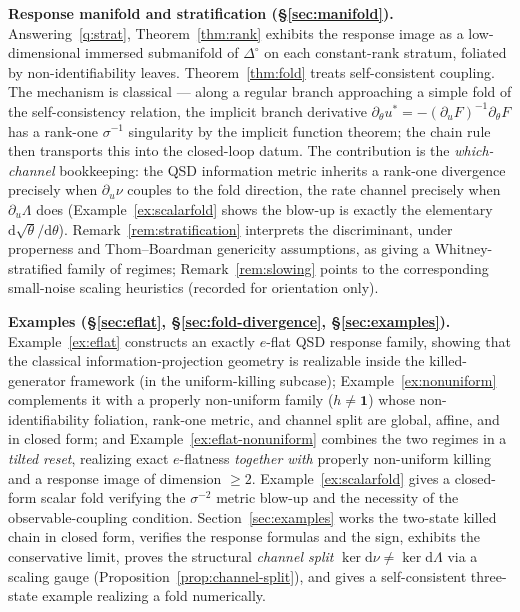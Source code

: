 \documentclass[11pt,reqno]{amsart}
\theoremstyle{plain}
\theoremstyle{definition}
\theoremstyle{remark}
\newcommand{\Simp}{\Delta^{\!\circ}}
\newcommand{\one}{\mathbf{1}}
\newcommand{\dd}{\mathrm{d}}
\begin{document}
\smallskip
\noindent\textbf{Response manifold and stratification (\S\ref{sec:manifold}).}
Answering~\ref{q:strat}, Theorem~\ref{thm:rank} exhibits the response image as a
low-dimensional immersed submanifold of $\Simp$ on each constant-rank stratum,
foliated by non-identifiability leaves. Theorem~\ref{thm:fold} treats self-consistent
coupling. The mechanism is classical --- along a regular branch approaching a simple
fold of the self-consistency relation, the implicit branch derivative
$\partial_\theta u^*=-(\partial_u F)^{-1}\partial_\theta F$ has a rank-one $\sigma^{-1}$
singularity by the implicit function theorem; the chain rule then transports this into
the closed-loop datum. The contribution is the \emph{which-channel} bookkeeping: the
QSD information metric inherits a rank-one divergence precisely when $\partial_u\nu$
couples to the fold direction, the rate channel precisely when $\partial_u\Lambda$ does
(Example~\ref{ex:scalarfold} shows the blow-up is exactly the elementary
$\dd\sqrt\theta/\dd\theta$).
Remark~\ref{rem:stratification} interprets the discriminant, under properness and
Thom--Boardman genericity assumptions, as giving a Whitney-stratified family of
regimes; Remark~\ref{rem:slowing} points to the corresponding small-noise scaling
heuristics (recorded for orientation only).

\smallskip
\noindent\textbf{Examples (\S\ref{sec:eflat}, \S\ref{sec:fold-divergence},
\S\ref{sec:examples}).}
Example~\ref{ex:eflat} constructs an exactly $e$-flat QSD response family, showing
that the classical information-projection geometry is realizable inside the
killed-generator framework (in the uniform-killing subcase);
Example~\ref{ex:nonuniform} complements it with a properly non-uniform family
($h\neq\one$) whose non-identifiability foliation, rank-one metric, and channel
split are global, affine, and in closed form; and
Example~\ref{ex:eflat-nonuniform} combines the two regimes in a \emph{tilted reset},
realizing exact $e$-flatness \emph{together with} properly non-uniform killing and a
response image of dimension $\ge2$. Example~\ref{ex:scalarfold} gives a closed-form scalar
fold verifying the $\sigma^{-2}$ metric blow-up and the necessity of the
observable-coupling condition. Section~\ref{sec:examples} works the two-state
killed chain in closed form, verifies the response formulas and the sign, exhibits
the conservative limit, proves the structural \emph{channel split}
$\ker\dd\nu\neq\ker\dd\Lambda$ via a scaling gauge
(Proposition~\ref{prop:channel-split}), and gives a self-consistent three-state
example realizing a fold numerically.
\end{document}
